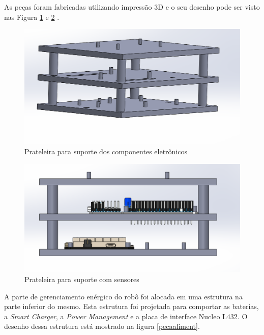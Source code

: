 As peças foram fabricadas utilizando impressão 3D e o seu desenho pode ser visto nas Figura \ref{Prateleira} e \ref{Prateleiracsensor} .

 \begin{figure}[h]
 	\centering
 	\includegraphics[width=14cm]{Figures/prateleira.png}
 	\caption{Prateleira para suporte dos componentes eletrônicos} \label{Prateleira}
 \end{figure}
 
  \begin{figure}[h]
  	\centering
  	\includegraphics[width=16cm]{Figures/prateleiracsensores.png}
  	\caption{Prateleira para suporte com sensores} \label{Prateleiracsensor}
  \end{figure}
 

A parte de gerenciamento enérgico do robô foi alocada em uma estrutura na parte inferior do mesmo. Esta estrutura foi projetada para comportar as baterias, a \textit{Smart Charger}, a \textit{Power Management} e a placa de interface Nucleo L432. O desenho dessa estrutura está mostrado na figura \ref{pecaaliment}.

